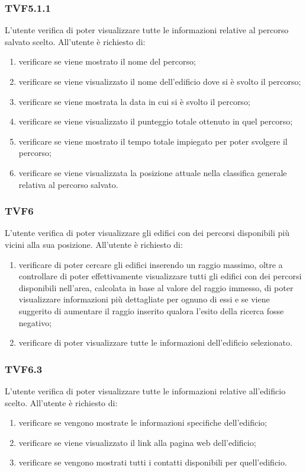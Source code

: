 		\subsubsection{TVF5.1.1}
			L'utente verifica di poter visualizzare tutte le informazioni relative al percorso salvato scelto.
			All'utente è richiesto di:
			\begin{enumerate}
				\item verificare se viene mostrato il nome del percorso;
				\item verificare se viene visualizzato il nome dell'edificio dove si è svolto il percorso;
				\item verificare se viene mostrata la data in cui si è svolto il percorso;
				\item verificare se viene visualizzato il punteggio totale ottenuto in quel percorso;
				\item verificare se viene mostrato il tempo totale impiegato per poter svolgere il percorso;
				\item verificare se viene visualizzata la posizione attuale nella classifica generale relativa al percorso salvato.
			\end{enumerate}
		\subsubsection{TVF6}
			L'utente verifica di poter visualizzare gli edifici con dei percorsi disponibili più vicini alla sua posizione.
			All'utente è richiesto di:
			\begin{enumerate}
				\item verificare di poter cercare gli edifici inserendo un raggio massimo, oltre a controllare di poter effettivamente visualizzare tutti gli edifici con dei percorsi disponibili nell'area, calcolata in base al valore del raggio immesso, di poter visualizzare informazioni più dettagliate per ognuno di essi e se viene suggerito di aumentare il raggio inserito qualora l'esito della ricerca fosse negativo;
				\item verificare di poter visualizzare tutte le informazioni dell'edificio selezionato.
			\end{enumerate}
		\subsubsection{TVF6.3}
			L'utente verifica di poter visualizzare tutte le informazioni relative all'edificio scelto.
			All'utente è richiesto di:
			\begin{enumerate}
				\item verificare se vengono mostrate le informazioni specifiche dell'edificio;
				\item verificare se viene visualizzato il link alla pagina web dell'edificio;
				\item verificare se vengono mostrati tutti i contatti disponibili per quell'edificio.
			\end{enumerate}
